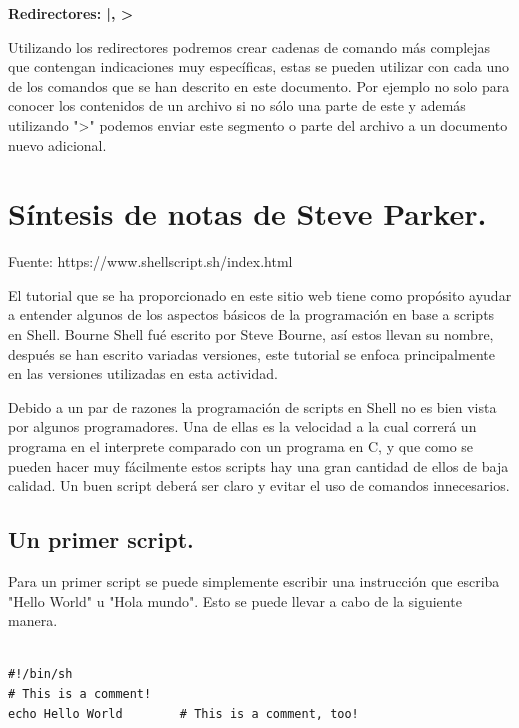 \documentclass{article} %
\begin{document}
\vspace{0.5 cm}


\textbf{Redirectores: |, >}  

\vspace{0.5 cm}
Utilizando los redirectores podremos crear cadenas de comando más complejas que contengan indicaciones muy específicas, estas se pueden utilizar con cada uno de los comandos que se han descrito en este documento. Por ejemplo no solo para conocer los contenidos de un archivo si no sólo una parte de este y además utilizando ">" podemos enviar este segmento o parte del archivo a un documento nuevo adicional. 


\section{Síntesis de notas de Steve Parker.}

Fuente: https://www.shellscript.sh/index.html
\vspace{0.5 cm}

El tutorial que se ha proporcionado en este sitio web tiene como propósito ayudar a entender algunos de los aspectos básicos de la programación en base a scripts en Shell. Bourne Shell fué escrito por Steve Bourne, así estos llevan su nombre, después se han escrito variadas versiones, este tutorial se enfoca principalmente en las versiones utilizadas en esta actividad. 
\vspace{0.5 cm}

Debido a un par de razones la programación de scripts en Shell no es bien vista por algunos programadores. Una de ellas es la velocidad a la cual correrá un programa en el interprete comparado con un programa en C, y que como se pueden hacer muy fácilmente estos scripts hay una gran cantidad de ellos de baja calidad. Un buen script deberá ser claro y evitar el uso de comandos innecesarios. 
\vspace{0.5 cm}

\subsection{Un primer script.}

Para un primer script se puede simplemente escribir una instrucción que escriba "Hello World" u "Hola mundo". Esto se puede llevar a cabo de la siguiente manera.

\begin{verbatim} 

#!/bin/sh
# This is a comment!
echo Hello World        # This is a comment, too!

\end{verbatim}
\end{document}
